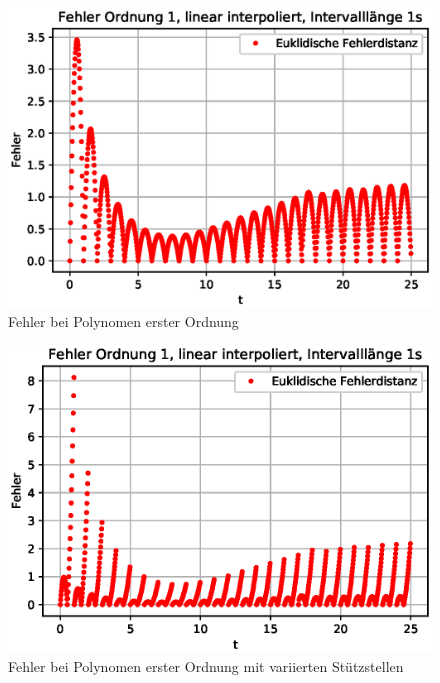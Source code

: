 \begin{figure}
	\centering
	\includegraphics[scale=0.7]{papers/perturbation/bilder/perturbation_fig6.eps}
	\caption{Fehler bei Polynomen erster Ordnung}
	\label{fig:ordnung1_linear_error_A}
\end{figure}

\begin{figure}
	\centering
	\includegraphics[scale=0.7]{papers/perturbation/bilder/perturbation_fig7.eps}
	\caption{Fehler bei Polynomen erster Ordnung mit variierten Stützstellen}
	\label{fig:ordnung1_linear_error_B}
\end{figure}

